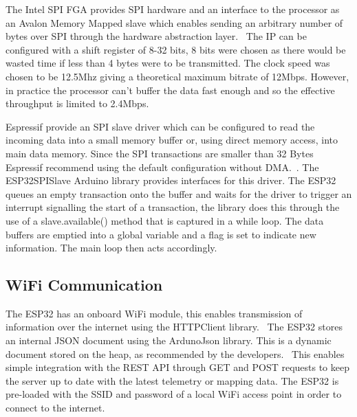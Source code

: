 The Intel SPI FGA provides SPI hardware and an interface to the processor as an Avalon Memory Mapped slave which enables sending an arbitrary number of bytes over SPI through the hardware abstraction layer.~\cite{ref:altera_spi} The IP can be configured with a shift register of 8-32 bits, 8 bits were chosen as there would be wasted time if less than 4 bytes were to be transmitted. The clock speed was chosen to be 12.5Mhz giving a theoretical maximum bitrate of 12Mbps. However, in practice the processor can’t buffer the data fast enough and so the effective throughput is limited to 2.4Mbps. 

Espressif provide an SPI slave driver which can be configured to read the incoming data into a small memory buffer or, using direct memory access, into main data memory. Since the SPI transactions are smaller than 32 Bytes Espressif recommend using the default configuration without DMA.~\cite{ref:esp_spi}. The ESP32SPISlave Arduino library provides interfaces for this driver. The ESP32 queues an empty transaction onto the buffer and waits for the driver to trigger an interrupt signalling the start of a transaction, the library does this through the use of a slave.available() method that is captured in a while loop. The data buffers are emptied into a global variable and a flag is set to indicate new information. The main loop then acts accordingly.

\subsection{WiFi Communication}

The ESP32 has an onboard WiFi module, this enables transmission of information over the internet using the HTTPClient library.~\cite{ref:esp_http} The ESP32 stores an internal JSON document using the ArdunoJson library. This is a dynamic document stored on the heap, as recommended by the developers.~\cite{ref:arduinojson} This enables simple integration with the REST API through GET and POST requests to keep the server up to date with the latest telemetry or mapping data. The ESP32 is pre-loaded with the SSID and password of a local WiFi access point in order to connect to the internet.


